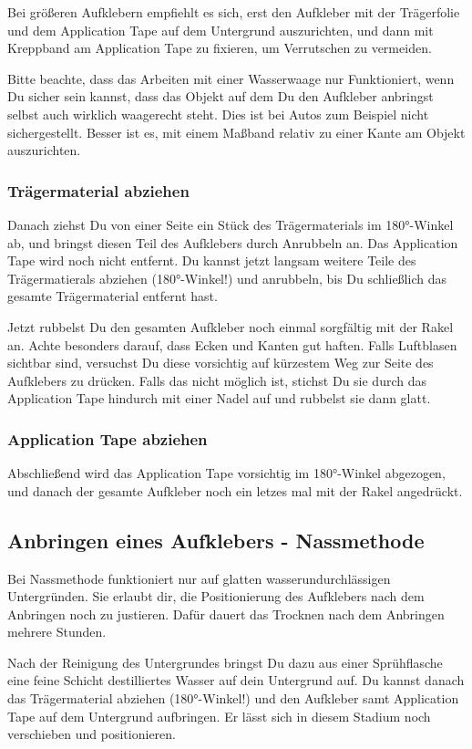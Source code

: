 \documentclass{\basedir/fablab-document}
\begin{document}
Bei größeren Aufklebern empfiehlt es sich, erst den Aufkleber mit der Trägerfolie und dem Application Tape auf dem Untergrund auszurichten, und dann mit Kreppband am Application Tape zu fixieren, um Verrutschen zu vermeiden.

Bitte beachte, dass das Arbeiten mit einer Wasserwaage nur Funktioniert, wenn Du sicher sein kannst, dass das Objekt auf dem Du den Aufkleber anbringst selbst auch wirklich waagerecht steht.
Dies ist bei Autos zum Beispiel nicht sichergestellt.
Besser ist es, mit einem Maßband relativ zu einer Kante am Objekt auszurichten.

\subsubsection{Trägermaterial abziehen}
Danach ziehst Du von einer Seite ein Stück des Trägermaterials im 180°-Winkel ab, und bringst diesen Teil des Aufklebers durch Anrubbeln an.
Das Application Tape wird noch nicht entfernt.
Du kannst jetzt langsam weitere Teile des Trägermatierals abziehen (180°-Winkel!) und anrubbeln,
bis Du schließlich das gesamte Trägermaterial entfernt hast.

Jetzt rubbelst Du den gesamten Aufkleber noch einmal sorgfältig mit der Rakel an.
Achte besonders darauf, dass Ecken und Kanten gut haften.
Falls Luftblasen sichtbar sind, versuchst Du diese vorsichtig auf kürzestem Weg zur Seite des Aufklebers zu drücken.
Falls das nicht möglich ist, stichst Du sie durch das Application Tape hindurch mit einer Nadel auf und rubbelst sie dann glatt.

\subsubsection{Application Tape abziehen}
Abschließend wird das Application Tape vorsichtig im 180°-Winkel abgezogen, und danach der gesamte Aufkleber noch ein letzes mal mit der Rakel angedrückt.

\subsection{Anbringen eines Aufklebers - Nassmethode}
Bei Nassmethode funktioniert nur auf glatten wasserundurchlässigen Untergründen.
Sie erlaubt dir, die Positionierung des Aufklebers nach dem Anbringen noch zu justieren. Dafür dauert das Trocknen nach dem Anbringen mehrere Stunden.

Nach der Reinigung des Untergrundes bringst Du dazu aus einer Sprühflasche eine feine Schicht destilliertes Wasser auf dein Untergrund auf.
Du kannst danach das Trägermaterial abziehen (180°-Winkel!) und den Aufkleber samt Application Tape auf dem Untergrund aufbringen.
Er lässt sich in diesem Stadium noch verschieben und positionieren.  
\end{document}
